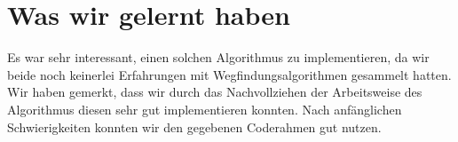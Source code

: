 \documentclass[a4paper]{scrartcl}
\begin{document}
\section*{Was wir gelernt haben}

Es war sehr interessant, einen solchen Algorithmus zu implementieren, da wir beide noch keinerlei Erfahrungen mit Wegfindungsalgorithmen gesammelt hatten.\\

Wir haben gemerkt, dass wir durch  das Nachvollziehen der Arbeitsweise des Algorithmus diesen sehr gut implementieren konnten. Nach anfänglichen Schwierigkeiten konnten wir den gegebenen Coderahmen gut nutzen.
\end{document}
